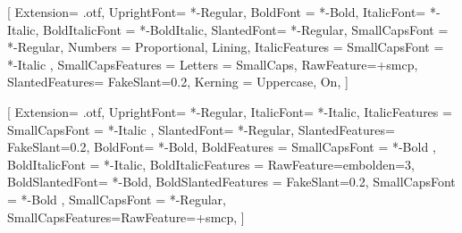 
\setmainfont{LibertinusSerif}[
	Extension=  .otf,
	UprightFont=  *-Regular,
	BoldFont          = *-Bold,
	ItalicFont=  *-Italic,
	BoldItalicFont    = *-BoldItalic,
	SlantedFont=  *-Regular,
	SmallCapsFont   =  *-Regular,
	Numbers           = {Proportional, Lining},
	ItalicFeatures  =  {  SmallCapsFont  =  *-Italic  },
	SmallCapsFeatures = {Letters = SmallCaps, RawFeature=+smcp},
	SlantedFeatures=  {FakeSlant=0.2},
	Kerning           = {Uppercase, On},
]

\setsansfont{LibertinusSans}[
	Extension=  .otf,
	UprightFont=  *-Regular,
	ItalicFont=  *-Italic,
	ItalicFeatures  =  {  SmallCapsFont  =  *-Italic  },
	SlantedFont=  *-Regular,
	SlantedFeatures=  {FakeSlant=0.2},
	BoldFont=  *-Bold,
	BoldFeatures    =  {  SmallCapsFont  =  *-Bold  },
	BoldItalicFont  =  *-Italic,
	BoldItalicFeatures  =  {RawFeature={embolden=3}},
	BoldSlantedFont=  *-Bold,
	BoldSlantedFeatures  =  {FakeSlant=0.2,  SmallCapsFont  =  *-Bold  },
	SmallCapsFont   =  *-Regular,
	SmallCapsFeatures={RawFeature=+smcp},
]


\setmonofont{Latin Modern Mono}




